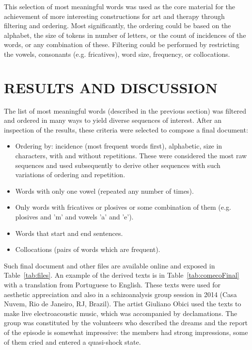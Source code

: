 \documentclass[12pt,fleqn]{article}
\begin{document}
This selection of most meaningful words was used as the core material for the achievement
of more interesting constructions for
art and therapy through filtering and ordering.
Most significantly, the ordering could be based on the alphabet, the size of tokens in number of letters,
or the count of incidences of the words, or any combination of these.
Filtering could be performed by restricting the vowels, consonants (e.g. fricatives), word size, frequency, or
collocations.

\section{RESULTS AND DISCUSSION}\label{sec:res}
The list of most meaningful words (described in the previous section) was filtered and ordered
in many ways to yield diverse sequences of interest.
After an inspection of the results, these criteria were selected to compose a final document:
\begin{itemize}
	\item Ordering by: incidence (most frequent words first),
alphabetic, size in characters, with and without repetitions.
These were considered the most raw sequences and used subsequently to derive other sequences
		with such variations of ordering and repetition.
	\item Words with only one vowel (repeated any number of times).
	\item Only words with fricatives or plosives or
some combination of them (e.g. plosives and 'm' and vowels 'a' and 'e').
	\item Words that start and end sentences.
	\item Collocations (pairs of words which are frequent).
\end{itemize}

Such final document and other files are available online and exposed in Table~\ref{tab:files}.
An example of the derived texts is in Table~\ref{tab:comecoFinal} with a translation
from Portuguese to English.
These texts were used for aesthetic appreciation and also in a schizoanalysis group session
in 2014 (Casa Nuvem, Rio de Janeiro, RJ, Brazil).
The artist Giuliano Obici used the texts to make live electroacoustic music,
which was accompanied by declamations.
The group was constituted by the volunteers who described the dreams and
the report of the episode is somewhat impressive:
the members had strong impressions, some of them cried and entered a quasi-shock state. 
\end{document}
